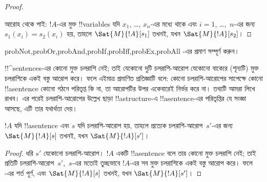 \documentclass[../../../include/open-logic-section]{subfiles}
\begin{document}
\begin{proof}
\begin{enumerate}
\end{enumerate}

আরোহ থেকে পাই: $!A$-এর মুক্ত !!{variable}s যদি $x_1$, \dots, $x_n$-এর
মধ্যে থাকে এবং $i = 1$, \dots,~$n$-এর জন্য $s_1(x_i)=s_2(x_i)$ হয়,
তাহলে $\Sat{M}{!A}[s_1]$ তখনই, যখন $\Sat{M}{!A}[s_2]$।
\end{proof}

\begin{probtag}{probNot,probOr,probAnd,probIf,probIff,probEx,probAll}
-এর প্রমাণ সম্পূর্ণ করুন।
\end{probtag}

\begin{explain}
!!^{sentence}s-এর কোনো মুক্ত চলরাশি নেই; তাই যেকোনো দুটি চলরাশি-আরোপ
যেকোনো বাক্যের (শূন্যটি) মুক্ত চলরাশিকে একই বস্তু আরোপ করে। ফলে এইমাত্র
প্রমাণিত প্রতিজ্ঞাটি বলে: কোনো চলরাশি-আরোপের সাপেক্ষে কোনো
!!a{sentence} কোনো গঠনে পরিতৃপ্ত কি না, তা আরোপটির উপর একেবারেই নির্ভর
করে না। তথ্যটি আমরা লিখে রাখব। এর পরেই চলরাশি-আরোপের উল্লেখ ছাড়া
!!a{structure}-এ !!a{sentence}-এর পরিতৃপ্তির যে সংজ্ঞা আসছে, এটি তার
যথার্থতা দেয়।
\end{explain}

\begin{cor}
$!A$ যদি !!a{sentence} এবং $s$ যদি চলরাশি-আরোপ হয়, তাহলে প্রত্যেক
চলরাশি-আরোপ~$s'$-এর জন্য $\Sat{M}{!A}[s]$ তখনই, যখন
$\Sat{M}{!A}[s']$।
\end{cor}

\begin{proof}
  ধরি $s'$ যেকোনো চলরাশি-আরোপ। $!A$ একটি !!a{sentence} বলে তার কোনো
  মুক্ত চলরাশি নেই; তাই প্রতিটি চলরাশি-আরোপ~$s'$,~$s$-এর মতোই তুচ্ছভাবে
  $!A$-এর সব মুক্ত চলরাশিকে একই বস্তু আরোপ করে। ফলে
  -এর শর্ত পূর্ণ, এবং $\Sat{M}{!A}[s]$ তখনই,
  যখন $\Sat{M}{!A}[s']$।
\end{proof}
\end{document}
